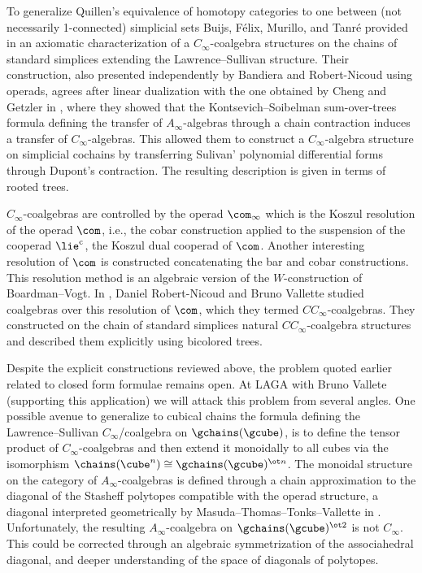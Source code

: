 To generalize Quillen's equivalence of homotopy categories to one between (not necessarily 1-connected) simplicial sets Buijs, F{\'e}lix, Murillo, and Tanr{\'e} provided in \cite{buijs2020liemodels} an axiomatic characterization of a $C_\infty$-coalgebra structures on the chains of standard simplices extending the Lawrence--Sullivan structure.
Their construction, also presented independently by Bandiera and Robert-Nicoud using operads, agrees after linear dualization with the one obtained by Cheng and Getzler in \cite{getzler2008transfering}, where they showed that the Kontsevich--Soibelman sum-over-trees formula defining the transfer of $A_\infty$-algebras through a chain contraction induces a transfer of $C_\infty$-algebras.
This allowed them to construct a $C_\infty$-algebra structure on simplicial cochains by transferring Sulivan' polynomial differential forms \cite{sullivan1977infinitesimal} through Dupont's contraction.
The resulting description is given in terms of rooted trees.

$C_\infty$-coalgebras are controlled by the operad $\com_\infty$ which is the Koszul resolution of the operad $\com$, i.e., the cobar construction applied to the suspension of the cooperad $\lie^{\mathrm c}$, the Koszul dual cooperad of $\com$.
Another interesting resolution of $\com$ is constructed concatenating the bar and cobar constructions.
This resolution method is an algebraic version of the $W$-construction of Boardman--Vogt.
In \cite{vallette2020higherlietheory}, Daniel Robert-Nicoud and Bruno Vallette studied coalgebras over this resolution of $\com$, which they termed $CC_\infty$-coalgebras.
They constructed on the chain of standard simplices natural $CC_\infty$-coalgebra structures and described them explicitly using bicolored trees.

Despite the explicit constructions reviewed above, the problem quoted earlier related to closed form formulae remains open.
At LAGA with Bruno Vallete (supporting this application) we will attack this problem from several angles.
One possible avenue to generalize to cubical chains the formula defining the Lawrence--Sullivan $C_\infty$\-/coalgebra on $\gchains(\gcube)$, is to define the tensor product of $C_\infty$-coalgebras and then extend it monoidally to all cubes via the isomorphism $\chains(\cube^n) \cong \gchains(\gcube)^{\ot n}$.
The monoidal structure on the category of $A_\infty$-coalgebras is defined through a chain approximation to the diagonal of the Stasheff polytopes compatible with the operad structure, a diagonal interpreted geometrically by Masuda--Thomas--Tonks--Vallette in \cite{vallette2021associahedra}.
Unfortunately, the resulting $A_\infty$-coalgebra on $\gchains(\gcube)^{\ot 2}$ is not $C_\infty$.
This could be corrected through an algebraic symmetrization of the associahedral diagonal, and deeper understanding of the space of diagonals of polytopes.

